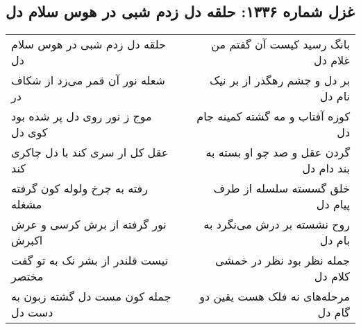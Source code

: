 \begin{center}
\section*{غزل شماره ۱۳۳۶: حلقه دل زدم شبی در هوس سلام دل}
\label{sec:1336}
\begin{longtable}{l p{0.5cm} r}
حلقه دل زدم شبی در هوس سلام دل
&&
بانگ رسید کیست آن گفتم من غلام دل
\\
شعله نور آن قمر می‌زد از شکاف در
&&
بر دل و چشم رهگذر از بر نیک نام دل
\\
موج ز نور روی دل پر شده بود کوی دل
&&
کوزه آفتاب و مه گشته کمینه جام دل
\\
عقل کل ار سری کند با دل چاکری کند
&&
گردن عقل و صد چو او بسته به بند دام دل
\\
رفته به چرخ ولوله کون گرفته مشغله
&&
خلق گسسته سلسله از طرف پیام دل
\\
نور گرفته از برش کرسی و عرش اکبرش
&&
روح نشسته بر درش می‌نگرد به بام دل
\\
نیست قلندر از بشر نک به تو گفت مختصر
&&
جمله نظر بود نظر در خمشی کلام دل
\\
جمله کون مست دل گشته زبون به دست دل
&&
مرحله‌های نه فلک هست یقین دو گام دل
\\
\end{longtable}
\end{center}
